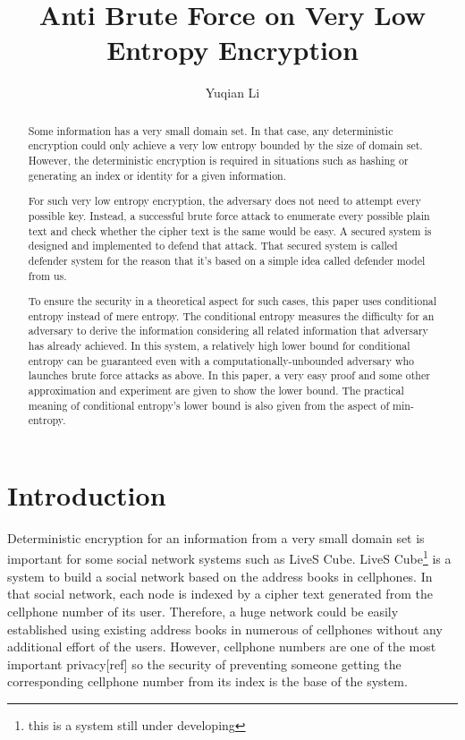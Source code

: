 \documentclass[10pt,a4paper]{article}
\author{Yuqian Li}
\title{Anti Brute Force on Very Low Entropy Encryption}
\date{}
\begin{document}
\maketitle
\begin{abstract}
	Some information has a very small domain set. In that case, any
	deterministic encryption could only
	achieve a very low entropy bounded by the size of domain set.
	However, the deterministic encryption is required
	in situations such as hashing or generating an index or identity for a
	given information. 
	
	For such very low entropy encryption, the adversary does not need to
	attempt every possible key. Instead, a successful brute force attack
	to enumerate every possible
	plain text and check whether the cipher text is the same
	would be easy. A secured system
	is designed and implemented to defend that attack.
	That secured system is called defender system for the reason that it's based
	on a simple idea called defender model from us. 
	
	To ensure the security in a theoretical aspect
	for such cases, this paper uses conditional entropy instead of mere entropy.
	The conditional entropy measures the difficulty for an adversary to
	derive the information considering all related information 
	that adversary has already achieved. 
	In this system,
	a relatively high lower
	bound for conditional entropy can be guaranteed even with 
	a computationally-unbounded adversary who launches brute force attacks as above.
	In this paper, a very easy proof and some other approximation
	and experiment are given to show the lower bound.
	The practical meaning of conditional entropy's lower bound is also
	given from the aspect of min-entropy.
\end{abstract}

\section{Introduction}
	Deterministic encryption for an information from
	a very small domain set is important for some social
	network systems such as LiveS Cube. LiveS Cube\footnote{this is a system still 
	under developing} is a system to
	build a social network based on the address books in cellphones.
	In that social network, each node is indexed by a cipher text generated
	from the cellphone number
	of its user. Therefore, a huge network could be easily established
	using existing address books in numerous of cellphones without
	any additional effort of the users. However, cellphone numbers are
	one of the most important privacy[ref] so the security of preventing
	someone getting the corresponding cellphone number from its index 
	is the base of the system.
	
\end{document}
